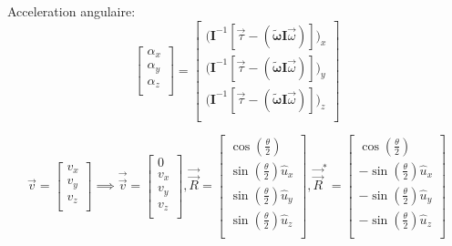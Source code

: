 \documentclass{article}
\begin{document}
Acceleration angulaire:
\begin{equation}
    \begin{bmatrix}
        \alpha_x \\
        \alpha_y \\
        \alpha_z \\
    \end{bmatrix}
=
\begin{bmatrix}
    \lparen\boldsymbol{I}^{-1}[\vec{\tau} - (\boldsymbol{\tilde{\omega}}\boldsymbol{I}\vec{\omega})]\rparen_x \\
    \lparen\boldsymbol{I}^{-1}[\vec{\tau} - (\boldsymbol{\tilde{\omega}}\boldsymbol{I}\vec{\omega})]\rparen_y \\
    \lparen\boldsymbol{I}^{-1}[\vec{\tau} - (\boldsymbol{\tilde{\omega}}\boldsymbol{I}\vec{\omega})]\rparen_z \\
\end{bmatrix}
\end{equation}

\begin{equation}
    \vec{v} = \begin{bmatrix}
        v_x \\
        v_y \\
        v_z \\
    \end{bmatrix}
    \implies
    \vec{\vec{v}} = \begin{bmatrix}
        0 \\
        v_x\\
        v_y \\
        v_z \\
    \end{bmatrix}
    ,
    \vec{\vec{R}} = \begin{bmatrix}
        \cos(\frac{\theta}{2}) \\
        \sin(\frac{\theta}{2}) \hat{u}_x \\
        \sin(\frac{\theta}{2}) \hat{u}_y\\
        \sin(\frac{\theta}{2}) \hat{u}_z\\
    \end{bmatrix}
    ,
    \vec{\vec{R}}^* = \begin{bmatrix}
        \cos(\frac{\theta}{2}) \\
        -\sin(\frac{\theta}{2}) \hat{u}_x\\
        -\sin(\frac{\theta}{2}) \hat{u}_y\\
        -\sin(\frac{\theta}{2}) \hat{u}_z\\
    \end{bmatrix}
\end{equation}
\end{document}
